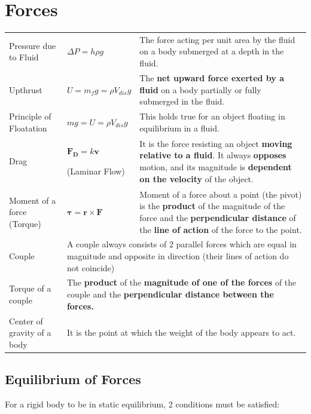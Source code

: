 \documentclass[a4paper,11pt]{article}
\begin{document}
	\section{Forces}
		\begin{center}
			\renewcommand{\arraystretch}{1.2}
			\begin{tabular}{@{} l l p{7cm} @{}}
				\toprule
				Pressure due to Fluid & $\Delta P = h\rho g$ & The force acting per unit area by the fluid on a body submerged at a depth in the fluid. \\
				Upthrust & $U=m_{f}g=\rho V_{dis}g$ & The \textbf{net upward force exerted by a fluid} on a body partially or fully submerged in the fluid. \\
				Principle of Floatation & $mg=U=\rho V_{dis} g$ & This holds true for an object floating in equilibrium in a fluid.  \\
				Drag & \multicolumn{1}{p{2.5cm}}{$\textbf{F}_{\textbf{D}}=k\textbf{v}$ \par (Laminar Flow)} & It is the force resisting an object \textbf{moving relative to a fluid}. It always \textbf{opposes} motion, and its magnitude is \textbf{dependent on the velocity} of the object.\\
				\midrule
				Moment of a force (Torque) & $\boldsymbol{\tau}=\textbf{r} \times \textbf{F}$ & Moment of a force about a point (the pivot) is the \textbf{product} of the magnitude of the force and the \textbf{perpendicular distance} of the \textbf{line of action} of the force to the point. \\
				Couple & \multicolumn{2}{p{10.3cm}}{A couple always consists of 2 parallel forces which are equal in magnitude and opposite in direction (their lines of action do not coincide)} \\
				Torque of a couple & \multicolumn{2}{p{10.3cm}}{The \textbf{product} of the \textbf{magnitude of one of the forces} of the couple and the \textbf{perpendicular distance between the forces.}} \\
				Center of gravity of a body & \multicolumn{2}{l}{It is the point at which the weight of the body appears to act.} \\
				\bottomrule
			\end{tabular}
		\end{center}
		\subsection{Equilibrium of Forces}
			For a rigid body to be in static equilibrium, 2 conditions must be satisfied:
			
\end{document}
